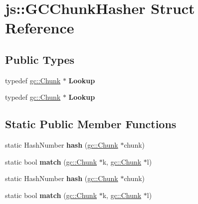 \hypertarget{structjs_1_1_g_c_chunk_hasher}{\section{js\-:\-:G\-C\-Chunk\-Hasher Struct Reference}
\label{structjs_1_1_g_c_chunk_hasher}
}
\subsection*{Public Types}
\begin{DoxyCompactItemize}
\item 
\hypertarget{structjs_1_1_g_c_chunk_hasher_a1b7d0ed7b3b41bbd91ec44b337ab297d}{typedef \hyperlink{structjs_1_1gc_1_1_chunk}{gc\-::\-Chunk} $\ast$ {\bfseries Lookup}}\label{structjs_1_1_g_c_chunk_hasher_a1b7d0ed7b3b41bbd91ec44b337ab297d}

\item 
\hypertarget{structjs_1_1_g_c_chunk_hasher_a1b7d0ed7b3b41bbd91ec44b337ab297d}{typedef \hyperlink{structjs_1_1gc_1_1_chunk}{gc\-::\-Chunk} $\ast$ {\bfseries Lookup}}\label{structjs_1_1_g_c_chunk_hasher_a1b7d0ed7b3b41bbd91ec44b337ab297d}

\end{DoxyCompactItemize}
\subsection*{Static Public Member Functions}
\begin{DoxyCompactItemize}
\item 
\hypertarget{structjs_1_1_g_c_chunk_hasher_a0da1d3b829d0ff5f3f35557ebf14ab4c}{static Hash\-Number {\bfseries hash} (\hyperlink{structjs_1_1gc_1_1_chunk}{gc\-::\-Chunk} $\ast$chunk)}\label{structjs_1_1_g_c_chunk_hasher_a0da1d3b829d0ff5f3f35557ebf14ab4c}

\item 
\hypertarget{structjs_1_1_g_c_chunk_hasher_a6eb0868a61b6b3d25293b941a2119458}{static bool {\bfseries match} (\hyperlink{structjs_1_1gc_1_1_chunk}{gc\-::\-Chunk} $\ast$k, \hyperlink{structjs_1_1gc_1_1_chunk}{gc\-::\-Chunk} $\ast$l)}\label{structjs_1_1_g_c_chunk_hasher_a6eb0868a61b6b3d25293b941a2119458}

\item 
\hypertarget{structjs_1_1_g_c_chunk_hasher_a0da1d3b829d0ff5f3f35557ebf14ab4c}{static Hash\-Number {\bfseries hash} (\hyperlink{structjs_1_1gc_1_1_chunk}{gc\-::\-Chunk} $\ast$chunk)}\label{structjs_1_1_g_c_chunk_hasher_a0da1d3b829d0ff5f3f35557ebf14ab4c}

\item 
\hypertarget{structjs_1_1_g_c_chunk_hasher_a6eb0868a61b6b3d25293b941a2119458}{static bool {\bfseries match} (\hyperlink{structjs_1_1gc_1_1_chunk}{gc\-::\-Chunk} $\ast$k, \hyperlink{structjs_1_1gc_1_1_chunk}{gc\-::\-Chunk} $\ast$l)}\label{structjs_1_1_g_c_chunk_hasher_a6eb0868a61b6b3d25293b941a2119458}

\end{DoxyCompactItemize}


